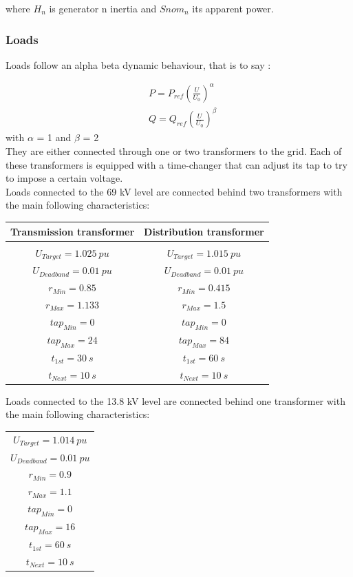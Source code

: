 \documentclass[a4paper, 12pt]{report}
\begin{document}
where $H_{n}$ is generator n inertia and $Snom_{n}$ its apparent power.
\subsubsection{Loads}

Loads follow an alpha beta dynamic behaviour, that is to say :

\[
\begin{aligned}
& P = P_{ref} (\frac{U}{U_{0}})^\alpha \\
& Q = Q_{ref} (\frac{U}{U_{0}})^\beta
\end{aligned}
\]
with $\alpha$ = 1 and $\beta$ = 2 \\

They are either connected through one or two transformers to the grid. Each of these transformers is equipped with a time-changer that can adjust its tap to try to impose a certain voltage.  \\

Loads connected to the 69 kV level are connected behind two transformers with the main following characteristics:
\begin{center}
\begin{tabular}{c|c}
   \textbf{Transmission transformer} & \textbf{Distribution transformer}  \\
   \hline
   \\
   $U_{Target}=1.025 \ pu $ & $U_{Target}=1.015 \ pu $   \\
   $U_{Deadband}=0.01 \ pu $ & $U_{Deadband}=0.01 \ pu $   \\
   $r_{Min}=0.85 $ & $r_{Min}=0.415 $ \\
   $r_{Max}=1.133 $ & $r_{Max}=1.5 $ \\
   $tap_{Min}=0 $ & $tap_{Min}=0 $ \\
   $tap_{Max}=24 $ & $tap_{Max}=84 $ \\
   $t_{1st}=30 \ s $ & $t_{1st}=60 \ s $   \\
   $t_{Next}=10 \ s $ & $t_{Next}=10 \ s $   \\
\end{tabular}
\end{center}

Loads connected to the 13.8 kV level are connected behind one transformer with the main following characteristics:

\begin{center}
\begin{tabular}{c}
   $U_{Target}=1.014 \ pu $  \\
   $U_{Deadband}=0.01 \ pu $ \\
   $r_{Min}=0.9 $ \\
   $r_{Max}=1.1 $ \\
   $tap_{Min}=0 $  \\
   $tap_{Max}=16 $ \\
   $t_{1st}=60 \ s $ \\
   $t_{Next}=10 \ s $  \\
\end{tabular}
\end{center}
\end{document}
